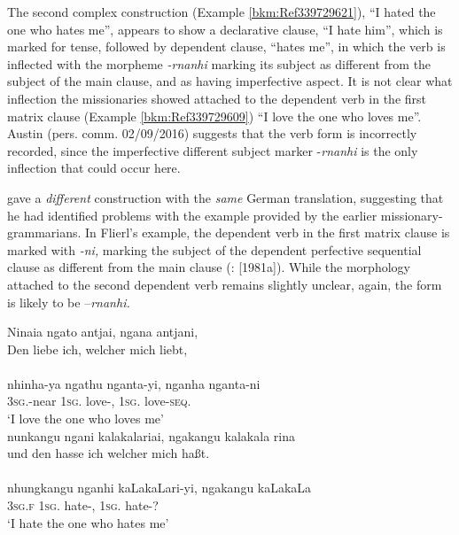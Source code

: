 
The second complex construction (Example \ref{bkm:Ref339729621}), ``I hated the one who hates me'', appears to show a declarative clause, ``I hate him'', which is marked for tense, followed by dependent clause, ``hates me'', in which the verb is inflected with the morpheme \textit{{}-rnanhi} marking its subject as different from the subject of the main clause, and as having imperfective aspect. It is not clear what inflection the missionaries showed attached to the dependent verb in the first matrix clause (Example \ref{bkm:Ref339729609}) ``I love the one who loves me''. Austin (pers. comm. 02/09/2016) suggests that the verb form is incorrectly recorded, since the imperfective different subject marker -\textit{rnanhi} is the only inflection that could occur here.

\citet[26]{flierl_dieri_1880} gave a \textit{different} construction with the \textit{same} German translation, suggesting that he had identified problems with the example provided by the earlier missionary-grammarians. In Flierl’s example, the dependent verb in the first matrix clause is marked with \textit{{}-ni,} marking the subject of the dependent perfective sequential clause as different from the main clause (\citealt{austin_grammar_2013}: [1981a]). While the morphology attached to the second dependent verb remains slightly unclear, again, the form is likely to be –\textit{rnanhi.}

\newpage
\ea
\label{bkm:Ref516470384}
Ninaia                   ngato         antjai,            ngana        antjani,\\
Den liebe ich, welcher mich liebt,\\
\citep[26]{flierl_dieri_1880}\\
\gll nhinha-ya            ngathu       nganta-yi,     nganha     nganta-ni\\
3\textsc{sg}.-near      1\textsc{sg}.     love-,  1\textsc{sg}.    love-\textsc{seq}.\\
\glt `I love the one who loves me' \\\medskip
{nunkangu}      {ngani}            {kalakalariai,}           {ngakangu}     {kalakala}  {rina}\\
und den hasse ich welcher mich haßt.\\
\citep[26]{flierl_dieri_1880}\\
\gll nhungkangu   nganhi         kaLakaLari-yi,          ngakangu      kaLakaLa\\
    3\textsc{sg}.\textsc{f}        1\textsc{sg}.       hate-,              1\textsc{sg}.        hate-?\\
\glt `I hate the one who hates me'
\z

